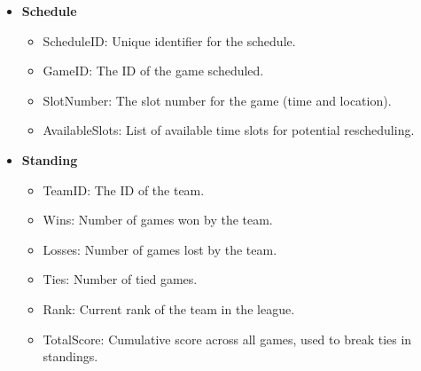 \documentclass[12pt]{article}
\begin{document}
\begin{itemize}
    \item \textbf{Schedule}
    \begin{itemize}
        \item ScheduleID: Unique identifier for the schedule.
        \item GameID: The ID of the game scheduled.
        \item SlotNumber: The slot number for the game (time and location).
        \item AvailableSlots: List of available time slots for potential rescheduling.
    \end{itemize}
    
    \item \textbf{Standing}
    \begin{itemize}
        \item TeamID: The ID of the team.
        \item Wins: Number of games won by the team.
        \item Losses: Number of games lost by the team.
        \item Ties: Number of tied games.
        \item Rank: Current rank of the team in the league.
        \item TotalScore: Cumulative score across all games, used to break ties in standings.
    \end{itemize}
\end{itemize}
\end{document}
